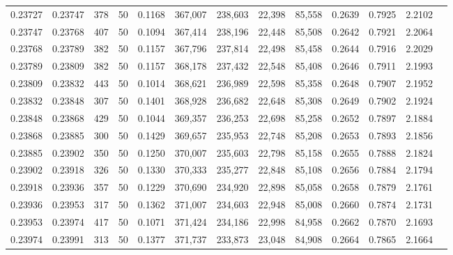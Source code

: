 \begin{tabular}{rrrrrrrrrrrrr}
0.23727 & 0.23747 &   378 &  50 &                                     0.1168 & 367,007 & 238,603 &  22,398 &  85,558 & 0.2639 & 0.7925 & 2.2102 \\
0.23747 & 0.23768 &   407 &  50 &                                     0.1094 & 367,414 & 238,196 &  22,448 &  85,508 & 0.2642 & 0.7921 & 2.2064 \\
0.23768 & 0.23789 &   382 &  50 &                                     0.1157 & 367,796 & 237,814 &  22,498 &  85,458 & 0.2644 & 0.7916 & 2.2029 \\
0.23789 & 0.23809 &   382 &  50 &                                     0.1157 & 368,178 & 237,432 &  22,548 &  85,408 & 0.2646 & 0.7911 & 2.1993 \\
0.23809 & 0.23832 &   443 &  50 &                                     0.1014 & 368,621 & 236,989 &  22,598 &  85,358 & 0.2648 & 0.7907 & 2.1952 \\
0.23832 & 0.23848 &   307 &  50 &                                     0.1401 & 368,928 & 236,682 &  22,648 &  85,308 & 0.2649 & 0.7902 & 2.1924 \\
0.23848 & 0.23868 &   429 &  50 &                                     0.1044 & 369,357 & 236,253 &  22,698 &  85,258 & 0.2652 & 0.7897 & 2.1884 \\
0.23868 & 0.23885 &   300 &  50 &                                     0.1429 & 369,657 & 235,953 &  22,748 &  85,208 & 0.2653 & 0.7893 & 2.1856 \\
0.23885 & 0.23902 &   350 &  50 &                                     0.1250 & 370,007 & 235,603 &  22,798 &  85,158 & 0.2655 & 0.7888 & 2.1824 \\
0.23902 & 0.23918 &   326 &  50 &                                     0.1330 & 370,333 & 235,277 &  22,848 &  85,108 & 0.2656 & 0.7884 & 2.1794 \\
0.23918 & 0.23936 &   357 &  50 &                                     0.1229 & 370,690 & 234,920 &  22,898 &  85,058 & 0.2658 & 0.7879 & 2.1761 \\
0.23936 & 0.23953 &   317 &  50 &                                     0.1362 & 371,007 & 234,603 &  22,948 &  85,008 & 0.2660 & 0.7874 & 2.1731 \\
0.23953 & 0.23974 &   417 &  50 &                                     0.1071 & 371,424 & 234,186 &  22,998 &  84,958 & 0.2662 & 0.7870 & 2.1693 \\
0.23974 & 0.23991 &   313 &  50 &                                     0.1377 & 371,737 & 233,873 &  23,048 &  84,908 & 0.2664 & 0.7865 & 2.1664 \\

\end{tabular}
